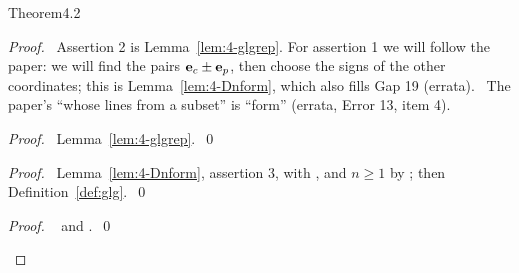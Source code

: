 \begin{cgss}{Theorem}{4.2}\label{thm:4.2}
\end{cgss}
\begin{proof}
 \pfsketch\ Assertion 2 is Lemma~\ref{lem:4-glgrep}. For assertion 1 we will follow the paper:
 we will find the pairs ${\mathbf e}_c\pm{\mathbf e}_p$, then choose the signs of the other coordinates; this is
 Lemma~\ref{lem:4-Dnform}, which also fills Gap 19 (errata).
 \repair\ The paper's ``whose lines from a subset'' is ``form'' (errata, Error 13, item 4).
 \begin{proof}\pf\ Lemma~\ref{lem:4-glgrep}.~\qed\end{proof}
 \begin{proof}\pf\ Lemma~\ref{lem:4-Dnform}, assertion 3, with , and $n\ge1$ by
  ; then Definition~\ref{def:glg}.~\qed\end{proof}
 \qedstep
 \begin{proof}\pf\  and .~\qed\end{proof}
\end{proof}

